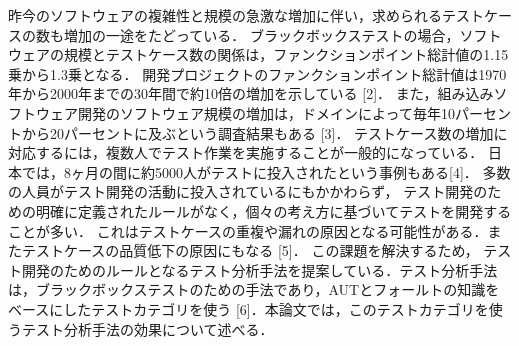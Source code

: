 \documentclass[a4paper,12pt]{jreport}
\begin{document}
昨今のソフトウェアの複雑性と規模の急激な増加に伴い，求められるテストケースの数も増加の一途をたどっている．
ブラックボックステストの場合，ソフトウェアの規模とテストケース数の関係は，ファンクションポイント総計値の1.15乗から1.3乗となる．
開発プロジェクトのファンクションポイント総計値は1970年から2000年までの30年間で約10倍の増加を示している [2]．
また，組み込みソフトウェア開発のソフトウェア規模の増加は，ドメインによって毎年10パーセントから20パーセントに及ぶという調査結果もある [3]．
テストケース数の増加に対応するには，複数人でテスト作業を実施することが一般的になっている．
日本では，8ヶ月の間に約5000人がテストに投入されたという事例もある[4]．
多数の人員がテスト開発の活動に投入されているにもかかわらず， テスト開発のための明確に定義されたルールがなく，個々の考え方に基づいてテストを開発することが多い．
これはテストケースの重複や漏れの原因となる可能性がある．またテストケースの品質低下の原因にもなる [5]．
 この課題を解決するため， テスト開発のためのルールとなるテスト分析手法を提案している．テスト分析手法は，ブラックボックステストのための手法であり，AUTとフォールトの知識をベースにしたテストカテゴリを使う [6]．本論文では，このテストカテゴリを使うテスト分析手法の効果について述べる．
\end{document}
